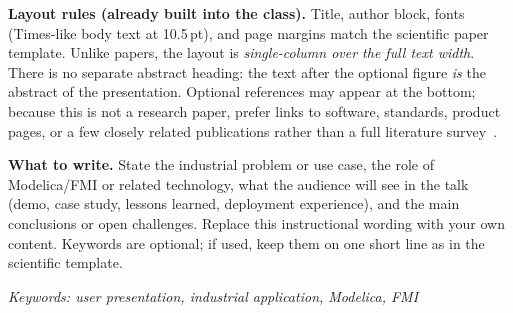 \documentclass[userpresentation]{modelica}
\begin{document}
\vspace{0.6ex}
\noindent
\textbf{Layout rules (already built into the class).}
Title, author block,
fonts (Times-like body text at 10.5\,pt), and page margins match the
scientific paper template. Unlike papers, the layout is
\emph{single-column over the full text width}. There is no separate
abstract heading: the text after the optional figure \emph{is} the abstract
of the presentation. Optional references may appear at the bottom; because
this is not a research paper, prefer links to software, standards, product
pages, or a few closely related publications rather than a full literature
survey~\cite{modelicaOrg,fmiStandard}.

\vspace{0.6ex}
\noindent
\textbf{What to write.} State the industrial problem or use case, the role of
Modelica/FMI or related technology, what the audience will see in the talk
(demo, case study, lessons learned, deployment experience), and the main
conclusions or open challenges. Replace this instructional wording with your
own content. Keywords are optional; if used, keep them on one short line as
in the scientific template.

\vspace{0.6ex}
\noindent
\emph{Keywords: user presentation, industrial application, Modelica, FMI}

\printbibliography[title=References]
\end{document}
